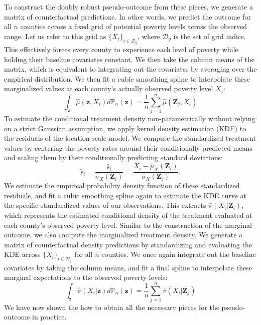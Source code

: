 \documentclass{article}
\theoremstyle{plain}
\theoremstyle{definition}
\theoremstyle{remark}
\begin{document}
To construct the doubly robust pseudo-outcome
from these pieces, we generate a matrix of counterfactual predictions. In other words, we predict the outcome for
all $n$ counties across a fixed grid of potential poverty levels across the observed range. Let us refer to this grid as $\{X_i\}_{i\in\mathcal D_g}$, where $\mathcal D_g$ is the set of grid indics. This effectively forces every county to experience each level of poverty while
holding their baseline covariates constant. We then
take the column means of the matrix, which is equivalent to integrating out the covariates by averaging over the
empirical distribution.
We then fit a cubic smoothing spline to interpolate
these marginalized values at each county's actually observed
poverty level $X_i$:
$$\int_\mathbf z\hat \mu(\mathbf z,X_i)d \mathbb P_n(\mathbf z)=\frac{1}{n}\sum_{j=1}^n \hat\mu(\mathbf Z_j,X_i)$$
To estimate the conditional treatment density non-parametrically without relying on a strict Gaussian assumption, we apply kernel density estimation (KDE) to the residuals of the location-scale model. We compute
the standardized treatment values by centering the poverty rates around their conditionally predicted means and scaling them by their conditionally predicting standard deviations:
$$\tilde \epsilon_i=\frac{\hat \epsilon_i}{\hat\sigma_X(\mathbf Z_i)}=\frac{X_i-\hat \mu_X(\mathbf Z_i)}{\hat \sigma_X(\mathbf Z_i)}.$$
We estimate the empirical probability density function of these standardized residuals, and fit a cubic smoothing
spline again to estimate the KDE curve at the specific
standardized values of our observations. This extracts $\hat \pi(X_i|\mathbf Z_i)$, which represents the estimated conditional density of the treatment evaluated at each county's observed poverty level. Similar to 
the construction of the marginal outcome, we also compute the marginalized treatment density. We generate a matrix of counterfactual density predictions by standardizing
and evaluating the KDE across $\{X_i\}_{i\in\mathcal D_g}$
for all $n$ counties. We once again integrate out the 
baseline covariates by taking the column means, and
fit a final spline to interpolate these marginal
expectations to the observed poverty levels:
$$\int_\mathbf z\hat \pi (X_i | \mathbf z)d \mathbb P_n(\mathbf z)=\frac{1}{n}\sum_{j=1}^n \hat\pi(X_i|\mathbf Z_j)$$
We have now shown the how to obtain all the necessary pieces for the pseudo-outcome in practice.
\end{document}
